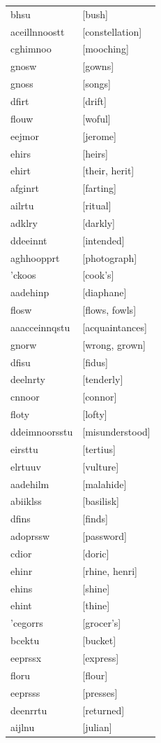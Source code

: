 \documentclass{article}
\begin{document}
\begin{tabular}{ll}
bhsu & [bush] \\
aceillnnoostt & [constellation] \\
cghimnoo & [mooching] \\
gnosw & [gowns] \\
gnoss & [songs] \\
dfirt & [drift] \\
flouw & [woful] \\
eejmor & [jerome] \\
ehirs & [heirs] \\
ehirt & [their, herit] \\
afginrt & [farting] \\
ailrtu & [ritual] \\
adklry & [darkly] \\
ddeeinnt & [intended] \\
aghhoopprt & [photograph] \\
'ckoos & [cook's] \\
aadehinp & [diaphane] \\
flosw & [flows, fowls] \\
aaacceinnqstu & [acquaintances] \\
gnorw & [wrong, grown] \\
dfisu & [fidus] \\
deelnrty & [tenderly] \\
cnnoor & [connor] \\
floty & [lofty] \\
ddeimnoorsstu & [misunderstood] \\
eirsttu & [tertius] \\
elrtuuv & [vulture] \\
aadehilm & [malahide] \\
abiiklss & [basilisk] \\
dfins & [finds] \\
adoprssw & [password] \\
cdior & [doric] \\
ehinr & [rhine, henri] \\
ehins & [shine] \\
ehint & [thine] \\
'cegorrs & [grocer's] \\
bcektu & [bucket] \\
eeprssx & [express] \\
floru & [flour] \\
eeprsss & [presses] \\
deenrrtu & [returned] \\
aijlnu & [julian] \\

\end{tabular}
\end{document}
